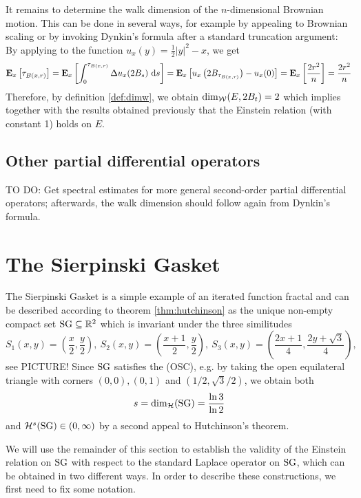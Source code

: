It remains to determine the walk dimension of the $n$-dimensional Brownian motion. This can be done in several ways, for example by appealing to Brownian scaling or by invoking Dynkin's formula after a standard truncation argument: By applying \cite[Lemma 19.21]{kallenberg2002foundations} to the function $u_x(y)=\frac{1}{2}|y|^2-x$, we get
\[
  \PTEp{\tau_{B(x,r)}}{x}
  =\PTEp{\int_0^{\tau_{B(x,r)}}\gD u_x(2B_s)\,\Di s}{x}
  =\PTEp{u_x\left(2B_{\tau_{B(x,r)}}\right)-u_x(0)}{x}
  =\PTEp{\frac{2r^2}{n}}{x}
  =\frac{2r^2}{n}
\]
Therefore, by definition \ref{def:dimw}, we obtain $\dimw(E,2B_t)=2$ which implies together with the results obtained previously that the Einstein relation (with constant 1) holds on $E$. 


\subsection{Other partial differential operators}

TO DO: Get spectral estimates for more general second-order partial differential operators; afterwards, the walk dimension should follow again from Dynkin's formula. 


\section{The Sierpinski Gasket}

The Sierpinski Gasket is a simple example of an iterated function fractal and can be described according to theorem \ref{thm:hutchinson} as the unique non-empty compact set $\SG\ssq\IR^2$ which is invariant under the three similitudes 
\[
  S_1(x,y)=\left(\frac{x}{2},\frac{y}{2}\right),\ 
  S_2(x,y)=\left(\frac{x+1}{2},\frac{y}{2}\right),\ 
  S_3(x,y)=\left(\frac{2x+1}{4},\frac{2y+\sqrt{3}}{4}\right),
\]
see PICTURE! Since $\SG$ satisfies the (OSC), e.g. by taking the open equilateral triangle with corners $(0,0), (0,1)$ and $(1/2,\sqrt{3}/2)$, we obtain both 
\begin{equation}\label{eq:SGdimh}
  s=\dimh(\SG)=\frac{\ln 3}{\ln 2}
\end{equation}
and $\cH^s(\SG)\in(0,\infty)$ by a second appeal to Hutchinson's theorem. 

We will use the remainder of this section to establish the validity of the Einstein relation on $\SG$ with respect to the standard Laplace operator on $\SG$, which can be obtained in two different ways. In order to describe these constructions, we first need to fix some notation. 

